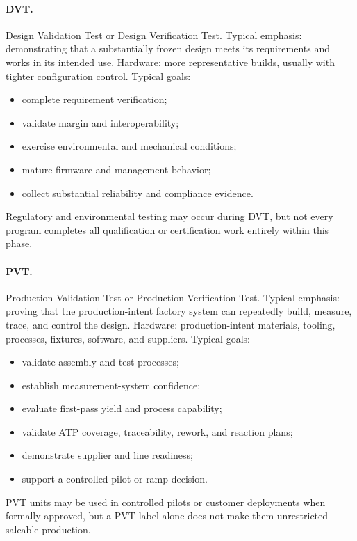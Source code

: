 \paragraph{DVT.}
Design Validation Test or Design Verification Test.
Typical emphasis: demonstrating that a substantially frozen design meets its
requirements and works in its intended use.
Hardware: more representative builds, usually with tighter configuration
control.
Typical goals:
\begin{itemize}
\item complete requirement verification;
\item validate margin and interoperability;
\item exercise environmental and mechanical conditions;
\item mature firmware and management behavior;
\item collect substantial reliability and compliance evidence.
\end{itemize}
Regulatory and environmental testing may occur during DVT, but not every
program completes all qualification or certification work entirely within this
phase.

\paragraph{PVT.}
Production Validation Test or Production Verification Test.
Typical emphasis: proving that the production-intent factory system can
repeatedly build, measure, trace, and control the design.
Hardware: production-intent materials, tooling, processes, fixtures, software,
and suppliers.
Typical goals:
\begin{itemize}
\item validate assembly and test processes;
\item establish measurement-system confidence;
\item evaluate first-pass yield and process capability;
\item validate ATP coverage, traceability, rework, and reaction plans;
\item demonstrate supplier and line readiness;
\item support a controlled pilot or ramp decision.
\end{itemize}
PVT units may be used in controlled pilots or customer deployments when
formally approved, but a PVT label alone does not make them unrestricted
saleable production.


